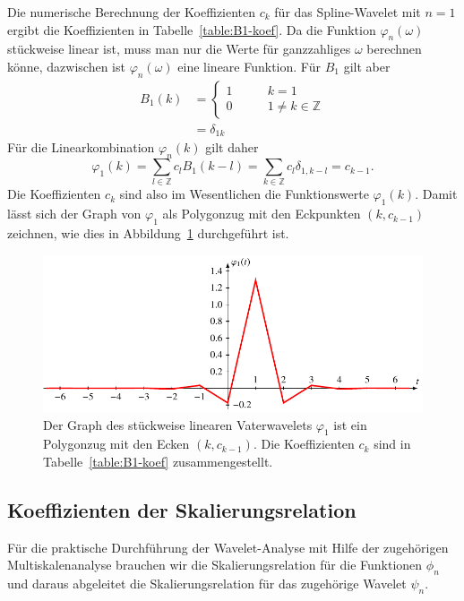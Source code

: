 \begin{beispiel}
Die numerische Berechnung der Koeffizienten $c_k$ für das Spline-Wavelet 
mit $n=1$ ergibt die Koeffizienten in Tabelle~\ref{table:B1-koef}.
Da die Funktion $\varphi_n(\omega)$ stückweise linear ist, muss man nur die
Werte für ganzzahliges $\omega$ berechnen könne, dazwischen ist
$\varphi_n(\omega)$ eine lineare Funktion.
Für $B_1$ gilt aber
\begin{align*}
B_1(k)
&=
\begin{cases}
1&\qquad k=1\\
0&\qquad 1\ne k\in\mathbb Z
\end{cases}
\\
&=\delta_{1k}
\end{align*}
Für die Linearkombination $\varphi_n(k)$ gilt daher
\[
\varphi_1(k)
=
\sum_{l\in\mathbb Z} c_l B_1(k-l)
=
\sum_{k\in\mathbb Z} c_l \delta_{1,k-l}
=
c_{k-1}.
\]
Die Koeffizienten $c_k$ sind also im Wesentlichen die Funktionswerte
$\varphi_1(k)$.
Damit lässt sich der Graph von $\varphi_1$ als Polygonzug mit den Eckpunkten
$(k,c_{k-1})$ zeichnen, wie dies in Abbildung~\ref{phi1:polygonzug}
durchgeführt ist.
\begin{figure}
\centering
\includegraphics{chapters/9-spline/images/Bphi1.pdf}
\caption{Der Graph des stückweise linearen Vaterwavelets $\varphi_1$
ist ein Polygonzug mit den Ecken $(k,c_{k-1})$.
Die Koeffizienten $c_k$ sind in Tabelle~\ref{table:B1-koef} 
zusammengestellt.
\label{phi1:polygonzug}}
\end{figure}
\end{beispiel}

\subsection{Koeffizienten der Skalierungsrelation
\label{subsection:spline-skalierungskoeffizienten}}
Für die praktische Durchführung der Wavelet-Analyse mit Hilfe der
zugehörigen Multiskalenana\-ly\-se brauchen wir die Skalierungsrelation 
für die Funktionen $\phi_n$ und daraus abgeleitet die
Skalierungsrelation für das zugehörige Wavelet $\psi_n$.

